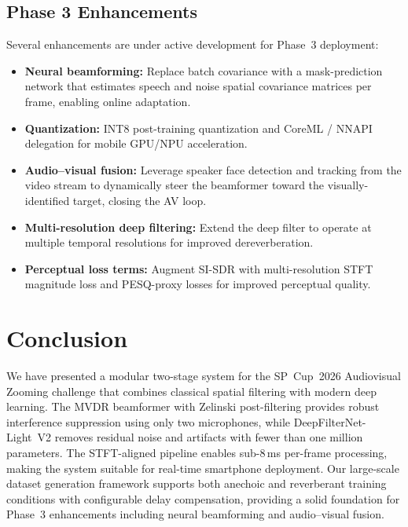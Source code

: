 \documentclass[a4paper]{article}
\begin{document}
\subsection{Phase 3 Enhancements}
Several enhancements are under active development for Phase~3 deployment:
\begin{itemize}\itemsep0pt
\item \textbf{Neural beamforming:} Replace batch covariance with a
      mask-prediction network that estimates speech and noise spatial
      covariance matrices per frame, enabling online adaptation.
\item \textbf{Quantization:} INT8 post-training quantization and CoreML /
      NNAPI delegation for mobile GPU/NPU acceleration.
\item \textbf{Audio--visual fusion:} Leverage speaker face detection and
      tracking from the video stream to dynamically steer the beamformer
      toward the visually-identified target, closing the AV loop.
\item \textbf{Multi-resolution deep filtering:} Extend the deep filter to
      operate at multiple temporal resolutions for improved dereverberation.
\item \textbf{Perceptual loss terms:} Augment SI-SDR with multi-resolution
      STFT magnitude loss and PESQ-proxy losses for improved perceptual
      quality.
\end{itemize}

\section{Conclusion}
\label{sec:conclusion}

We have presented a modular two-stage system for the SP~Cup~2026 Audiovisual
Zooming challenge that combines classical spatial filtering with modern deep
learning.  The MVDR beamformer with Zelinski post-filtering provides robust
interference suppression using only two microphones, while
DeepFilterNet-Light~V2 removes residual noise and artifacts with fewer than
one million parameters.  The STFT-aligned pipeline enables sub-8\,ms
per-frame processing, making the system suitable for real-time smartphone
deployment.  Our large-scale dataset generation framework supports both
anechoic and reverberant training conditions with configurable delay
compensation, providing a solid foundation for Phase~3 enhancements including
neural beamforming and audio--visual fusion.



\end{document}
